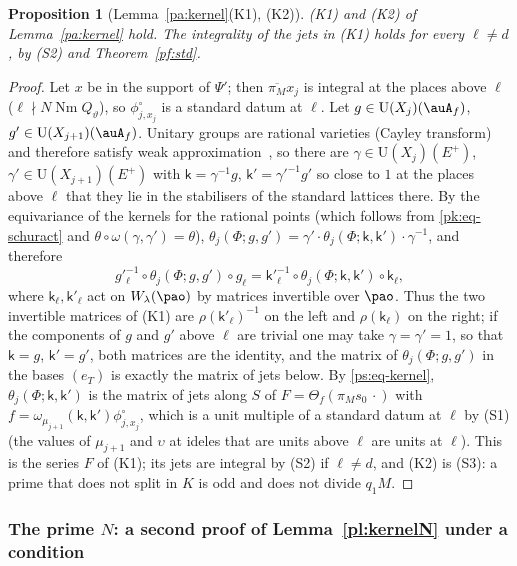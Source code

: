 \documentclass[10pt]{amsart}
\newtheorem{proposition}[theorem]{Proposition}
\theoremstyle{definition}
\theoremstyle{remark}
\providecommand{\auNm}{\operatorname{Nm}}
\providecommand{\auU}{\mathrm U}
\providecommand{\aubar}[1]{\overline{#1}}
\begin{document}
\begin{proposition}[Lemma~\ref{pa:kernel}(K1), (K2)]\label{pk:K12}
{\rm(K1)} and {\rm(K2)} of Lemma~\ref{pa:kernel} hold.
The integrality of the jets in (K1) holds for every $\ell\ne d$, by (S2) and Theorem~\ref{pf:std}.
\end{proposition}
\begin{proof}
Let $x$ be in the support of $\Psi'$; then $\aubar{\pi_M}x_j$ is integral at the places above
$\ell$ ($\ell\nmid N\auNm Q_\vartheta$), so $\phi^\circ_{j,x_j}$ is a standard datum at $\ell$. Let
$g\in\auU(X_j)(\auA_f)$, $g'\in\auU(X_{j+1})(\auA_f)$. Unitary groups are rational varieties (Cayley transform) and therefore satisfy weak
approximation~\cite[\S7.1, Propositions~7.3 and~7.4]{PlatonovRapinchuk}, so there are $\gamma\in\auU(X_j)(E^+)$, $\gamma'\in\auU(X_{j+1})(E^+)$ with $\mathsf k=\gamma^{-1}g$,
$\mathsf k'=\gamma'^{-1}g'$ so close to $1$ at the places above $\ell$ that they lie in the
stabilisers of the standard lattices there. By the equivariance of the kernels for the rational
points (which follows from \eqref{pk:eq-schuract} and $\theta\circ\omega(\gamma,\gamma')=\theta$),
$\theta_j(\Phi;g,g')=\gamma'\cdot\theta_j(\Phi;\mathsf k,\mathsf k')\cdot\gamma^{-1}$, and
therefore
\[
g'^{-1}_\ell\circ\theta_j(\Phi;g,g')\circ g_\ell=\mathsf k'^{-1}_\ell\circ\theta_j(\Phi;\mathsf k,
\mathsf k')\circ\mathsf k_\ell ,
\]
where $\mathsf k_\ell,\mathsf k'_\ell$ act on $W_\lambda(\pao)$ by matrices invertible over
$\pao$. Thus the two invertible matrices of (K1) are $\rho(\mathsf k'_\ell)^{-1}$ on the left and
$\rho(\mathsf k_\ell)$ on the right; if the components of $g$ and $g'$ above $\ell$ are trivial one
may take $\gamma=\gamma'=1$, so that $\mathsf k=g$, $\mathsf k'=g'$, both matrices are the identity,
and the matrix of $\theta_j(\Phi;g,g')$ in the bases $(e_T)$ is exactly the matrix of jets below. By \eqref{ps:eq-kernel}, $\theta_j(\Phi;\mathsf k,\mathsf k')$ is the matrix of jets along
$S$ of $F=\Theta_f(\pi_Ms_0\,\cdot)$ with $f=\omega_{\mu_{j+1}}(\mathsf k,\mathsf k')
\phi^\circ_{j,x_j}$, which is a unit multiple of a standard datum at $\ell$ by (S1) (the values of
$\mu_{j+1}$ and $\upsilon$ at ideles that are units above $\ell$ are units at $\ell$). This is the
series $F$ of (K1); its jets are integral by (S2) if $\ell\ne d$, and (K2) is (S3): a prime
that does not split in $K$ is odd and does not divide $q_1M$.
\end{proof}

\subsubsection{The prime $N$: a second proof of Lemma~\ref{pl:kernelN} under a condition}\label{pk:ss-N}
\end{document}
